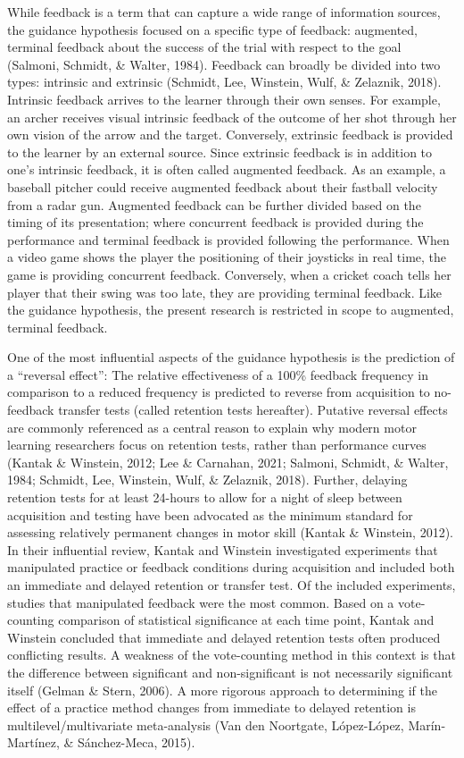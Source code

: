 \documentclass[
  english,
  man, donotrepeattitle,floatsintext]{apa7}
\begin{document}
While feedback is a term that can capture a wide range of information sources, the guidance hypothesis focused on a specific type of feedback: augmented, terminal feedback about the success of the trial with respect to the goal (Salmoni, Schmidt, \& Walter, 1984). Feedback can broadly be divided into two types: intrinsic and extrinsic (Schmidt, Lee, Winstein, Wulf, \& Zelaznik, 2018). Intrinsic feedback arrives to the learner through their own senses. For example, an archer receives visual intrinsic feedback of the outcome of her shot through her own vision of the arrow and the target. Conversely, extrinsic feedback is provided to the learner by an external source. Since extrinsic feedback is in addition to one's intrinsic feedback, it is often called augmented feedback. As an example, a baseball pitcher could receive augmented feedback about their fastball velocity from a radar gun. Augmented feedback can be further divided based on the timing of its presentation; where concurrent feedback is provided during the performance and terminal feedback is provided following the performance. When a video game shows the player the positioning of their joysticks in real time, the game is providing concurrent feedback. Conversely, when a cricket coach tells her player that their swing was too late, they are providing terminal feedback. Like the guidance hypothesis, the present research is restricted in scope to augmented, terminal feedback.

One of the most influential aspects of the guidance hypothesis is the prediction of a ``reversal effect'': The relative effectiveness of a 100\% feedback frequency in comparison to a reduced frequency is predicted to reverse from acquisition to no-feedback transfer tests (called retention tests hereafter). Putative reversal effects are commonly referenced as a central reason to explain why modern motor learning researchers focus on retention tests, rather than performance curves (Kantak \& Winstein, 2012; Lee \& Carnahan, 2021; Salmoni, Schmidt, \& Walter, 1984; Schmidt, Lee, Winstein, Wulf, \& Zelaznik, 2018). Further, delaying retention tests for at least 24-hours to allow for a night of sleep between acquisition and testing have been advocated as the minimum standard for assessing relatively permanent changes in motor skill (Kantak \& Winstein, 2012). In their influential review, Kantak and Winstein investigated experiments that manipulated practice or feedback conditions during acquisition and included both an immediate and delayed retention or transfer test. Of the included experiments, studies that manipulated feedback were the most common. Based on a vote-counting comparison of statistical significance at each time point, Kantak and Winstein concluded that immediate and delayed retention tests often produced conflicting results. A weakness of the vote-counting method in this context is that the difference between significant and non-significant is not necessarily significant itself (Gelman \& Stern, 2006). A more rigorous approach to determining if the effect of a practice method changes from immediate to delayed retention is multilevel/multivariate meta-analysis (Van den Noortgate, López-López, Marín-Martínez, \& Sánchez-Meca, 2015).
\end{document}
